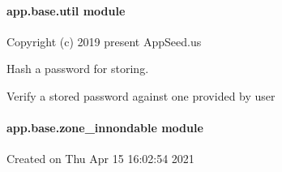 \documentclass[letterpaper,10pt,french]{sphinxmanual}
\begin{document}
\begin{fulllineitems}
\label{\detokenize{app.base:app.base.routes.unauthorized_handler}}
\end{fulllineitems}



\paragraph{app.base.util module}
\label{\detokenize{app.base:module-app.base.util}}\label{\detokenize{app.base:app-base-util-module}}
\sphinxAtStartPar
Copyright (c) 2019 \sphinxhyphen{} present AppSeed.us

\begin{fulllineitems}
\label{\detokenize{app.base:app.base.util.hash_pass}}
\sphinxAtStartPar
Hash a password for storing.

\end{fulllineitems}


\begin{fulllineitems}
\label{\detokenize{app.base:app.base.util.verify_pass}}
\sphinxAtStartPar
Verify a stored password against one provided by user

\end{fulllineitems}



\paragraph{app.base.zone\_innondable module}
\label{\detokenize{app.base:module-app.base.zone_innondable}}\label{\detokenize{app.base:app-base-zone-innondable-module}}
\sphinxAtStartPar
Created on Thu Apr 15 16:02:54 2021
\end{document}
